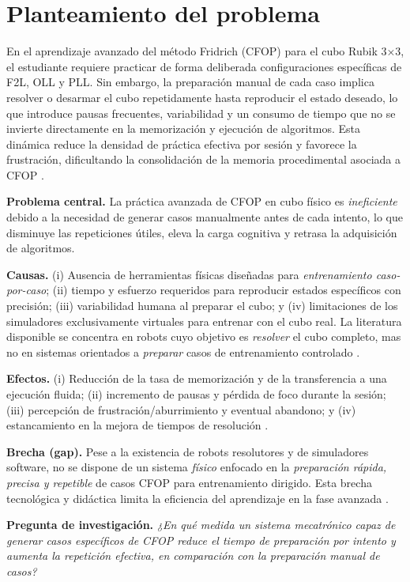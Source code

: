\section{Planteamiento del problema}
En el aprendizaje avanzado del método Fridrich (CFOP) para el cubo Rubik 3×3, el estudiante requiere practicar de forma deliberada configuraciones específicas de F2L, OLL y PLL. Sin embargo, la preparación manual de cada caso implica resolver o desarmar el cubo repetidamente hasta reproducir el estado deseado, lo que introduce pausas frecuentes, variabilidad y un consumo de tiempo que no se invierte directamente en la memorización y ejecución de algoritmos. Esta dinámica reduce la densidad de práctica efectiva por sesión y favorece la frustración, dificultando la consolidación de la memoria procedimental asociada a CFOP \cite{Boyce2022,Boyce2022b}.

\textbf{Problema central.} La práctica avanzada de CFOP en cubo físico es \emph{ineficiente} debido a la necesidad de generar casos manualmente antes de cada intento, lo que disminuye las repeticiones útiles, eleva la carga cognitiva y retrasa la adquisición de algoritmos.

\textbf{Causas.} (i) Ausencia de herramientas físicas diseñadas para \emph{entrenamiento caso-por-caso}; (ii) tiempo y esfuerzo requeridos para reproducir estados específicos con precisión; (iii) variabilidad humana al preparar el cubo; y (iv) limitaciones de los simuladores exclusivamente virtuales para entrenar con el cubo real. La literatura disponible se concentra en robots cuyo objetivo es \emph{resolver} el cubo completo, mas no en sistemas orientados a \emph{preparar} casos de entrenamiento controlado \cite{Gorriz2023,Monzon2017}.

\textbf{Efectos.} (i) Reducción de la tasa de memorización y de la transferencia a una ejecución fluida; (ii) incremento de pausas y pérdida de foco durante la sesión; (iii) percepción de frustración/aburrimiento y eventual abandono; y (iv) estancamiento en la mejora de tiempos de resolución \cite{Boyce2022}.

\textbf{Brecha (gap).} Pese a la existencia de robots resolutores y de simuladores software, no se dispone de un sistema \emph{físico} enfocado en la \emph{preparación rápida, precisa y repetible} de casos CFOP para entrenamiento dirigido. Esta brecha tecnológica y didáctica limita la eficiencia del aprendizaje en la fase avanzada \cite{Gorriz2023,Monzon2017}.

\textbf{Pregunta de investigación.} 
\emph{¿En qué medida un sistema mecatrónico capaz de generar casos específicos de CFOP reduce el tiempo de preparación por intento y aumenta la repetición efectiva, en comparación con la preparación manual de casos?}

